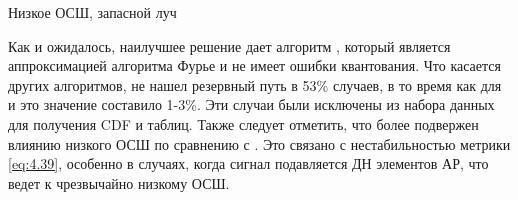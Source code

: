 \begin{table}[H]
  \begin{center}
    \caption{Низкое ОСШ, запасной луч}
    \label{tab:multipath:static:LOW-SNR:2}
  \end{center}
\end{table}

Как и ожидалось, наилучшее решение дает алгоритм \hSearchMMSE, который
является аппроксимацией алгоритма Фурье и не имеет ошибки квантования. Что
касается других алгоритмов, \ACS не
нашел резервный путь в 53\% случаев, в то время как  для \AuxBeam и \hSearchMMSE 
это значение составило 1-3\%.  Эти случаи были исключены из набора
данных для получения CDF и таблиц. Также следует отметить, что \AuxBeam
более подвержен влиянию низкого ОСШ по сравнению с \hSearchMMSE. 
Это связано с нестабильностью метрики \eqref{eq:4.39}, особенно в случаях, когда 
сигнал подавляется ДН элементов АР, что ведет к чрезвычайно низкому ОСШ.